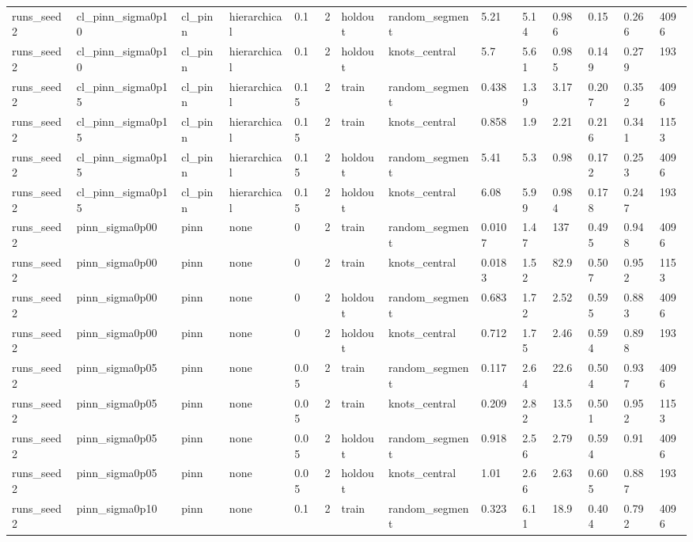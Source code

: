 \begin{table}[t]
\begin{tabular}{llllllllllllll}
runs\_seed2 & cl\_pinn\_sigma0p10 & cl\_pinn & hierarchical & 0.1 & 2 & holdout & random\_segment & 5.21 & 5.14 & 0.986 & 0.15 & 0.266 & 4096 \\
runs\_seed2 & cl\_pinn\_sigma0p10 & cl\_pinn & hierarchical & 0.1 & 2 & holdout & knots\_central & 5.7 & 5.61 & 0.985 & 0.149 & 0.279 & 193 \\
runs\_seed2 & cl\_pinn\_sigma0p15 & cl\_pinn & hierarchical & 0.15 & 2 & train & random\_segment & 0.438 & 1.39 & 3.17 & 0.207 & 0.352 & 4096 \\
runs\_seed2 & cl\_pinn\_sigma0p15 & cl\_pinn & hierarchical & 0.15 & 2 & train & knots\_central & 0.858 & 1.9 & 2.21 & 0.216 & 0.341 & 1153 \\
runs\_seed2 & cl\_pinn\_sigma0p15 & cl\_pinn & hierarchical & 0.15 & 2 & holdout & random\_segment & 5.41 & 5.3 & 0.98 & 0.172 & 0.253 & 4096 \\
runs\_seed2 & cl\_pinn\_sigma0p15 & cl\_pinn & hierarchical & 0.15 & 2 & holdout & knots\_central & 6.08 & 5.99 & 0.984 & 0.178 & 0.247 & 193 \\
runs\_seed2 & pinn\_sigma0p00 & pinn & none & 0 & 2 & train & random\_segment & 0.0107 & 1.47 & 137 & 0.495 & 0.948 & 4096 \\
runs\_seed2 & pinn\_sigma0p00 & pinn & none & 0 & 2 & train & knots\_central & 0.0183 & 1.52 & 82.9 & 0.507 & 0.952 & 1153 \\
runs\_seed2 & pinn\_sigma0p00 & pinn & none & 0 & 2 & holdout & random\_segment & 0.683 & 1.72 & 2.52 & 0.595 & 0.883 & 4096 \\
runs\_seed2 & pinn\_sigma0p00 & pinn & none & 0 & 2 & holdout & knots\_central & 0.712 & 1.75 & 2.46 & 0.594 & 0.898 & 193 \\
runs\_seed2 & pinn\_sigma0p05 & pinn & none & 0.05 & 2 & train & random\_segment & 0.117 & 2.64 & 22.6 & 0.504 & 0.937 & 4096 \\
runs\_seed2 & pinn\_sigma0p05 & pinn & none & 0.05 & 2 & train & knots\_central & 0.209 & 2.82 & 13.5 & 0.501 & 0.952 & 1153 \\
runs\_seed2 & pinn\_sigma0p05 & pinn & none & 0.05 & 2 & holdout & random\_segment & 0.918 & 2.56 & 2.79 & 0.594 & 0.91 & 4096 \\
runs\_seed2 & pinn\_sigma0p05 & pinn & none & 0.05 & 2 & holdout & knots\_central & 1.01 & 2.66 & 2.63 & 0.605 & 0.887 & 193 \\
runs\_seed2 & pinn\_sigma0p10 & pinn & none & 0.1 & 2 & train & random\_segment & 0.323 & 6.11 & 18.9 & 0.404 & 0.792 & 4096 \\

\end{tabular}
\end{table}

